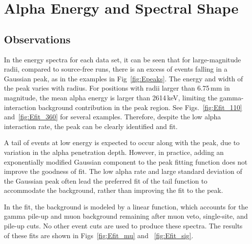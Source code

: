 \section{Alpha Energy and Spectral Shape}
\subsection{Observations}\label{ssec:E_obs}
In the energy spectra for each data set, it can be seen that for large-magnitude radii, compared to source-free runs, there is an excess of events falling in a Gaussian peak, as in the examples in Fig~\ref{fig:Epeaks}. The energy and width of the peak varies with radius. For positions with radii larger than 6.75\,mm in magnitude, the mean alpha energy is larger than 2614\,keV, limiting the gamma-interaction background contribution in the peak region. See Figs.~\ref{fig:Efit_110} and~\ref{fig:Efit_360} for several examples. Therefore, despite the low alpha interaction rate, the peak can be clearly identified and fit.

A tail of events at low energy is expected to occur along with the peak, due to variation in the alpha penetration depth. However, in practice, adding an exponentially modified Gaussian component to the peak fitting function does not improve the goodness of fit. The low alpha rate and large standard deviation of the Gaussian peak often lead the preferred fit of the tail function to accommodate the background, rather than improving the fit to the peak. 

In the fit, the background is modeled by a linear function, which accounts for the gamma pile-up and muon background remaining after muon veto, single-site, and pile-up cuts. No other event cuts are used to produce these spectra. The results of these fits are shown in Figs~\ref{fig:Efit_mu} and ~\ref{fig:Efit_sig}.

